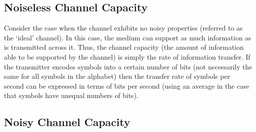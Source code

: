 \documentclass[letterpaper,twoside,10pt]{article}
\begin{document}
\subsection{Noiseless Channel Capacity}

Consider the case when the channel exhibits no noisy properties (referred to as the `ideal' channel). In this case, the medium can support as much information as is transmitted across it. Thus, the channel capacity (the amount of information able to be supported by the channel) is simply the rate of information transfer. If the transmitter encodes symbols into a certain number of bits (not necessarily the same for all symbols in the alphabet) then the transfer rate of symbols per second can be expressed in terms of bits per second (using an average in the case that symbols have unequal numbers of bits). 

\subsection{Noisy Channel Capacity}
\end{document}
